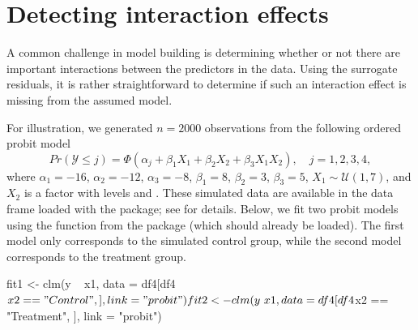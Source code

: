 \section{Detecting interaction effects}

A common challenge in model building is determining whether or not there are important interactions between the predictors in the data. Using the surrogate residuals, it is rather straightforward to determine if such an interaction effect is missing from the assumed model.

For illustration, we generated $n = 2000$ observations from the following ordered probit model
\begin{equation*}
  Pr\left(\mathcal{Y} \le j\right) = \Phi\left(\alpha_j + \beta_1 X_1 + \beta_2 X_2 + \beta_3 X_1 X_2\right), \quad j = 1, 2, 3, 4,
\end{equation*}
where $\alpha_1 = -16$, $\alpha_2 = -12$, $\alpha_3 = -8$, $\beta_1 = 8$, $\beta_2 = 3$, $\beta_3 = 5$, $X_1 \sim \mathcal{U}\left(1, 7\right)$, and $X_2$ is a factor with levels  and . These simulated data are available in the  data frame loaded with the  package; see  for details. Below, we fit two probit models using the  function from the  package (which should already be loaded). The first model only corresponds to the simulated control group, while the second model corresponds to the treatment group.
\begin{example}
fit1 <- clm(y ~ x1, data = df4[df4$x2 == "Control", ], link = "probit")
fit2 <- clm(y ~ x1, data = df4[df4$x2 == "Treatment", ], link = "probit")
\end{example}

